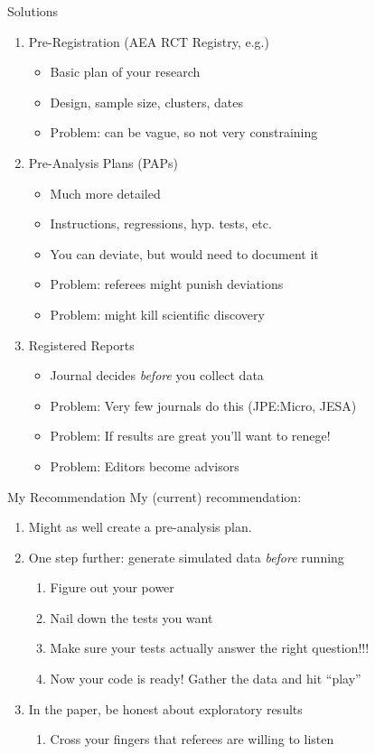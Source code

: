 \begin{frame}{Solutions}
\begin{enumerate}
    \item Pre-Registration (AEA RCT Registry, e.g.)
    \begin{itemize}
        \item Basic plan of your research
        \item Design, sample size, clusters, dates
        \item Problem: can be vague, so not very constraining
    \end{itemize}
    \item Pre-Analysis Plans (PAPs)
    \begin{itemize}
        \item Much more detailed
        \item Instructions, regressions, hyp. tests, etc.
        \item You can deviate, but would need to document it
        \item Problem: referees might punish deviations
        \item Problem: might kill scientific discovery
    \end{itemize}
    \item Registered Reports
    \begin{itemize}
        \item Journal decides \textit{before} you collect data
        \item Problem: Very few journals do this (JPE:Micro, JESA)
        \item Problem: If results are great you'll want to renege!
        \item Problem: Editors become advisors
    \end{itemize}
\end{enumerate}
\end{frame}

\begin{frame}{My Recommendation}
My (current) recommendation:
\begin{enumerate}
    \item Might as well create a pre-analysis plan.
    \item One step further: generate simulated data \textit{before} running
    \begin{enumerate}
        \item Figure out your power
        \item Nail down the tests you want
        \item Make sure your tests actually answer the right question!!!
        \item Now your code is ready! Gather the data and hit ``play''
    \end{enumerate}
    \item In the paper, be honest about exploratory results
    \begin{enumerate}
        \item Cross your fingers that referees are willing to listen
    \end{enumerate}
\end{enumerate}
\end{frame}

